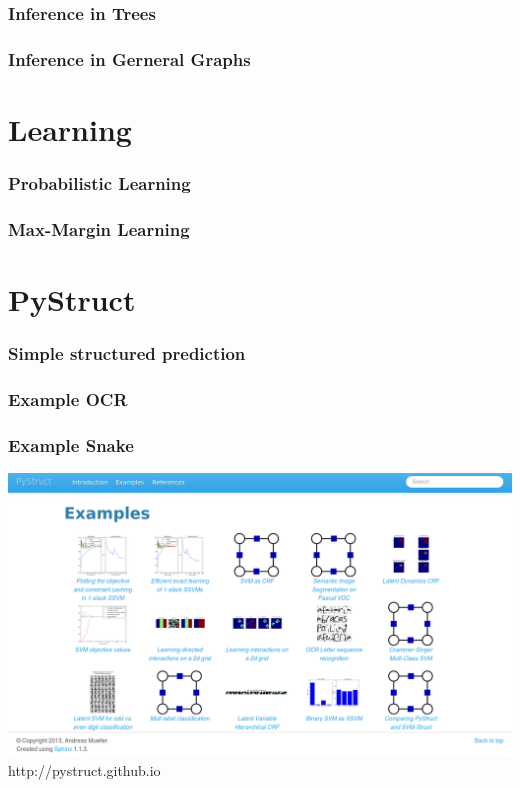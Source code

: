 \documentclass{beamer}
\begin{document}
    \begin{frame}
        \frametitle{Inference in Trees}
    \end{frame}

    \begin{frame}
        \frametitle{Inference in Gerneral Graphs}
    \end{frame}

    \section{Learning}
    \begin{frame}
        \frametitle{Probabilistic Learning}
    \end{frame}
    \begin{frame}
        \frametitle{Max-Margin Learning}
    \end{frame}


    \section{PyStruct}
    \begin{frame}
        \frametitle{Simple structured prediction}
    \end{frame}

    \begin{frame}
        \frametitle{Example OCR}
    \end{frame}

    \begin{frame}
        \frametitle{Example Snake}
    \end{frame}

    \begin{frame}
        \begin{center}
            \includegraphics[width=\linewidth]{images/example_gallery}\\
            http://pystruct.github.io
        \end{center}
    \end{frame}
    
	
\end{document}
